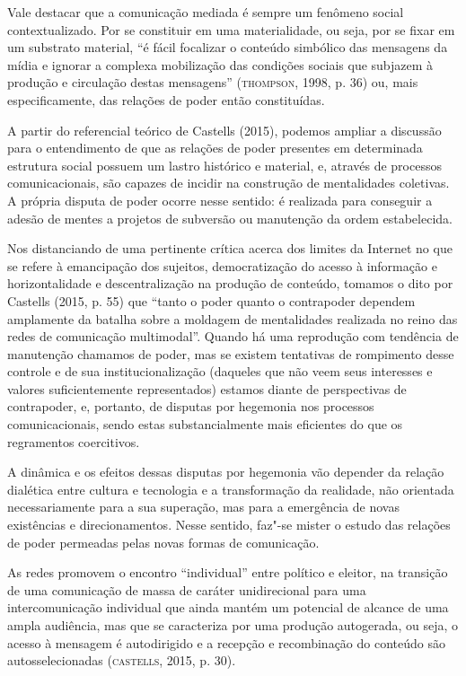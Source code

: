 Vale destacar que a comunicação mediada é sempre um fenômeno social
contextualizado. Por se constituir em uma materialidade, ou seja, por se
fixar em um substrato material, ``é fácil focalizar o conteúdo simbólico
das mensagens da mídia e ignorar a complexa mobilização das condições
sociais que subjazem à produção e circulação destas mensagens''
(\textsc{thompson}, 1998, p. 36) ou, mais especificamente, das relações de poder
então constituídas.

A partir do referencial teórico de Castells (2015), podemos ampliar a
discussão para o entendimento de que as relações de poder presentes em
determinada estrutura social possuem um lastro histórico e material, e,
através de processos comunicacionais, são capazes de incidir na
construção de mentalidades coletivas. A própria disputa de poder ocorre
nesse sentido: é realizada para conseguir a adesão de mentes a projetos
de subversão ou manutenção da ordem estabelecida.

Nos distanciando de uma pertinente crítica acerca dos limites da
Internet no que se refere à emancipação dos sujeitos, democratização do
acesso à informação e horizontalidade e descentralização na produção de
conteúdo, tomamos o dito por Castells (2015, p. 55) que ``tanto o poder
quanto o contrapoder dependem amplamente da batalha sobre a moldagem de
mentalidades realizada no reino das redes de comunicação multimodal''.
Quando há uma reprodução com tendência de manutenção chamamos de poder,
mas se existem tentativas de rompimento desse controle e de sua
institucionalização (daqueles que não veem seus interesses e valores
suficientemente representados) estamos diante de perspectivas de
contrapoder, e, portanto, de disputas por hegemonia nos processos
comunicacionais, sendo estas substancialmente mais eficientes do que os
regramentos coercitivos.

A dinâmica e os efeitos dessas disputas por hegemonia vão depender da
relação dialética entre cultura e tecnologia e a transformação da
realidade, não orientada necessariamente para a sua superação, mas para
a emergência de novas existências e direcionamentos. Nesse sentido,
faz"-se mister o estudo das relações de poder permeadas pelas novas
formas de comunicação.

As redes promovem o encontro ``individual'' entre político e eleitor, na
transição de uma comunicação de massa de caráter unidirecional para uma
intercomunicação individual que ainda mantém um potencial de alcance de
uma ampla audiência, mas que se caracteriza por uma produção autogerada,
ou seja, o acesso à mensagem é autodirigido e a recepção e recombinação
do conteúdo são autosselecionadas (\textsc{castells}, 2015, p. 30).

